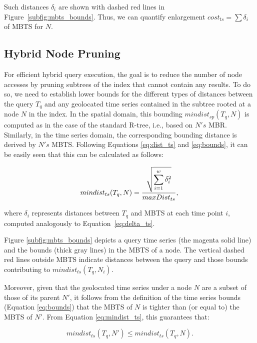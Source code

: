 \noindent Such distances $\delta_i$ are shown with dashed red lines in Figure~\ref{subfig:mbts_bounds}. Thus, we can quantify enlargement $cost_{ts} = \sum{\delta_i}$ of MBTS for $N$. 

\subsection{Hybrid Node Pruning}
\label{subsec:index_pruning}

For efficient hybrid query execution, the goal is to reduce the number of node accesses by pruning subtrees of the index that cannot contain any results. To do so, we need to establish lower bounds for the different types of distances between the query $T_q$ and any geolocated time series contained in the subtree rooted at a node $N$ in the index. In the spatial domain, this bounding $mindist_{sp}(T_q, N)$ is computed as in the case of the standard R-tree, i.e., based on $N's$ MBR. Similarly, in the time series domain, the corresponding bounding distance is derived by $N's$ MBTS. Following Equations \ref{eq:dist_ts} and \ref{eq:bounds}, it can be easily seen that this can be calculated as follows:

\begin{equation}
 mindist_{ts}(T_q, N) = \frac{\displaystyle \sqrt{\sum_{i=1}^{w} \delta_i^2}}{maxDist_{ts}}, \\
\label{eq:mindist_ts}
\end{equation}

\noindent where $\delta_i$ represents distances between $T_q$ and MBTS at each time point $i$, computed analogously to Equation~\ref{eq:delta_ts}.

\begin{myexample}
  Figure \ref{subfig:mbts_bounds} depicts a query time series (the magenta solid line) and the bounds (thick gray lines) in the MBTS of a node. The vertical dashed red lines outside MBTS indicate distances between the query and those bounds contributing to $mindist_{ts}(T_q, N_i)$. 
\end{myexample}

Moreover, given that the geolocated time series under a node $N$ are a subset of those of its parent $N'$, it follows from the definition of the time series bounds (Equation \ref{eq:bounds}) that the MBTS of $N$ is tighter than (or equal to) the MBTS of $N'$. From Equation \ref{eq:mindist_ts}, this guarantees that:

\begin{equation}
 mindist_{ts}(T_q, N') \leq mindist_{ts}(T_q, N).
\end{equation}

